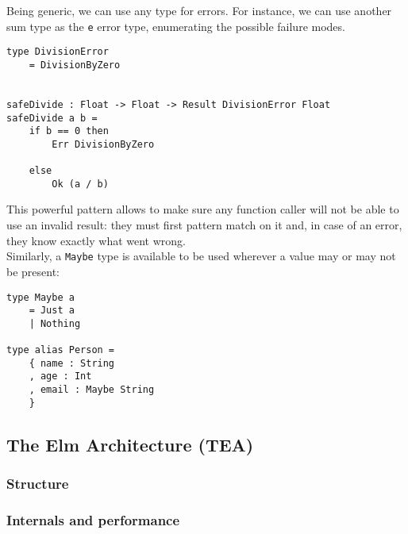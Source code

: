 Being generic, we can use any type for errors. For instance, we can use another sum type as the \texttt{e} error type, enumerating the possible failure modes. 
\begin{verbatim}
type DivisionError
    = DivisionByZero


safeDivide : Float -> Float -> Result DivisionError Float
safeDivide a b =
    if b == 0 then
        Err DivisionByZero

    else
        Ok (a / b)
\end{verbatim}
This powerful pattern allows to make sure any function caller will not be able to use an invalid result: they must first pattern match on it and, in case of an error, they know exactly what went wrong.\\

Similarly, a \texttt{Maybe} type is available to be used wherever a value may or may not be present:
\begin{verbatim}
type Maybe a
    = Just a
    | Nothing

type alias Person =
    { name : String
    , age : Int
    , email : Maybe String
    }
\end{verbatim}

\subsection{The Elm Architecture (TEA)}
\subsubsection{Structure}
\subsubsection{Internals and performance}